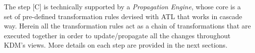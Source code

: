 The step [C] is technically supported by a \textit{Propagation Engine}, whose core is a set of pre-defined transformation rules devised with ATL that works in cascade way. Herein all the transformation rules act as a chain of transformations that are executed together in order to update/propagate all the changes throughout KDM's views. More details on each step are provided in the next sections.







